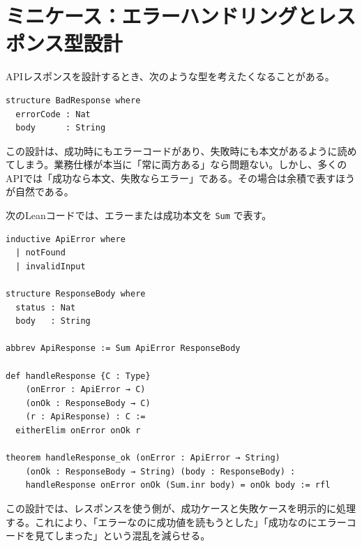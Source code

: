 \section{ミニケース：エラーハンドリングとレスポンス型設計}
\label{sec:ch07-api-response}

APIレスポンスを設計するとき、次のような型を考えたくなることがある。

\begin{listing}[htbp]
\begin{verbatim}
structure BadResponse where
  errorCode : Nat
  body      : String
\end{verbatim}
\caption{積でエラーと値を同時に持つ設計}
\label{lst:ch07_bad_response}
\end{listing}

この設計は、成功時にもエラーコードがあり、失敗時にも本文があるように読めてしまう。業務仕様が本当に「常に両方ある」なら問題ない。しかし、多くのAPIでは「成功なら本文、失敗ならエラー」である。その場合は余積で表すほうが自然である。


次のLeanコードでは、エラーまたは成功本文を \texttt{Sum} で表す。

\begin{listing}[htbp]
\begin{verbatim}
inductive ApiError where
  | notFound
  | invalidInput

structure ResponseBody where
  status : Nat
  body   : String

abbrev ApiResponse := Sum ApiError ResponseBody

def handleResponse {C : Type}
    (onError : ApiError → C)
    (onOk : ResponseBody → C)
    (r : ApiResponse) : C :=
  eitherElim onError onOk r

theorem handleResponse_ok (onError : ApiError → String)
    (onOk : ResponseBody → String) (body : ResponseBody) :
    handleResponse onError onOk (Sum.inr body) = onOk body := rfl
\end{verbatim}
\caption{APIレスポンスを余積として設計する}
\label{lst:ch07_api_response}
\end{listing}

この設計では、レスポンスを使う側が、成功ケースと失敗ケースを明示的に処理する。これにより、「エラーなのに成功値を読もうとした」「成功なのにエラーコードを見てしまった」という混乱を減らせる。

